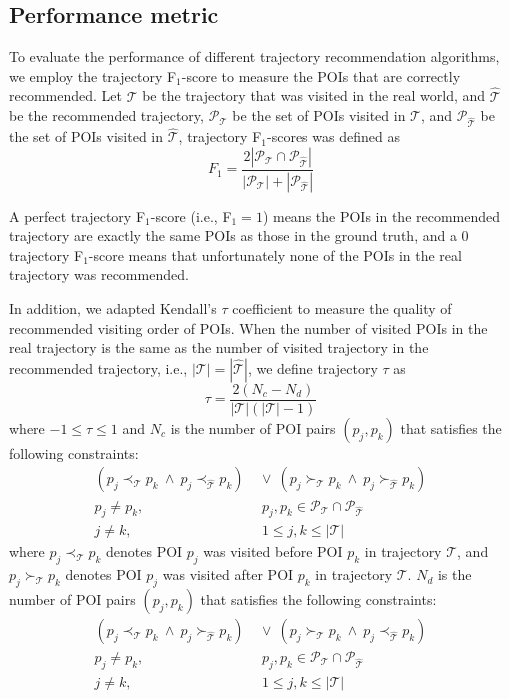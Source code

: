 \subsection{Performance metric}
\label{metric}
%
To evaluate the performance of different trajectory recommendation algorithms,
we employ the trajectory F$_1$-score\cite{ijcai15} to measure the POIs that are 
correctly recommended. Let $\mathcal{T}$ be the trajectory that was visited in the real world,
and $\hat{\mathcal{T}}$ be the recommended trajectory,
$\mathcal{P}_{\mathcal{T}}$ be the set of POIs visited in $\mathcal{T}$,
and $\mathcal{P}_{\hat{\mathcal{T}}}$ be the set of POIs visited in $\hat{\mathcal{T}}$,
trajectory F$_1$-scores was defined as
\begin{displaymath}
    F_1 = \frac{2 |\mathcal{P}_{\mathcal{T}} \cap \mathcal{P}_{\hat{\mathcal{T}}}|}
               {|\mathcal{P}_{\mathcal{T}}| + |\mathcal{P}_{\hat{\mathcal{T}}}|}
\end{displaymath}

A perfect trajectory F$_1$-score (i.e., F$_1 = 1$) means the POIs in the recommended trajectory are exactly 
the same POIs as those in the ground truth, and a $0$ trajectory F$_1$-score means that unfortunately none of 
the POIs in the real trajectory was recommended.

In addition, we adapted Kendall's $\tau$ coefficient \cite{kendalltau} to measure the quality of 
recommended visiting order of POIs.
When the number of visited POIs in the real trajectory is the same
as the number of visited trajectory in the recommended trajectory,
i.e., $|\mathcal{T}| = |\hat{\mathcal{T}}|$,
we define trajectory $\tau$ as 
\begin{displaymath}
    \tau = \frac{2(N_c - N_d)}{|\mathcal{T}|(|\mathcal{T}|-1)}
\end{displaymath}
where $-1 \le \tau \le 1$ and $N_c$ is the number of POI pairs $(p_j, p_k)$ that satisfies the following constraints:
\begin{align*}
    (p_j \prec_{\mathcal{T}} p_k ~\land~ p_j \prec_{\hat{\mathcal{T}}} p_k) & ~\lor~
    (p_j \succ_{\mathcal{T}} p_k ~\land~ p_j \succ_{\hat{\mathcal{T}}} p_k) \\
    p_j \ne p_k, &~~ p_j, p_k \in \mathcal{P}_{\mathcal{T}} \cap \mathcal{P}_{\hat{\mathcal{T}}} \\
    j \ne k, &~~ 1 \le j, k \le |\mathcal{T}|
\end{align*}
where $p_j \prec_{\mathcal{T}} p_k$ denotes POI $p_j$ was visited before POI $p_k$ in trajectory $\mathcal{T}$,
and $p_j \succ_{\mathcal{T}} p_k$ denotes POI $p_j$ was visited after POI $p_k$ in trajectory $\mathcal{T}$.
$N_d$ is the number of POI pairs $(p_j, p_k)$ that satisfies the following constraints:
\begin{align*}
    (p_j \prec_{\mathcal{T}} p_k ~\land~ p_j \succ_{\hat{\mathcal{T}}} p_k) & ~\lor~
    (p_j \succ_{\mathcal{T}} p_k ~\land~ p_j \prec_{\hat{\mathcal{T}}} p_k) \\
    p_j \ne p_k, &~~ p_j, p_k \in \mathcal{P}_{\mathcal{T}} \cap \mathcal{P}_{\hat{\mathcal{T}}} \\
    j \ne k, &~~ 1 \le j, k \le |\mathcal{T}|
\end{align*}

